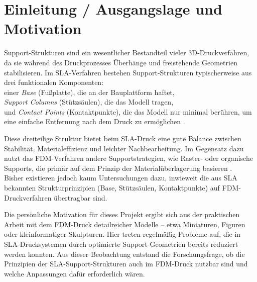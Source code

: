 \chapter{Einleitung / Ausgangslage und Motivation}
\label{cha:Einleitung / Ausgangslage und Motivation}

Support-Strukturen sind ein wesentlicher Bestandteil vieler 3D-Druckverfahren, da sie während des Druckprozesses Überhänge und freistehende Geometrien stabilisieren.  
Im SLA-Verfahren bestehen Support-Strukturen typischerweise aus drei funktionalen Komponenten:\\
einer \textit{Base} (Fußplatte), die an der Bauplattform haftet,\\
\textit{Support Columns} (Stützsäulen), die das Modell tragen,\\
und \textit{Contact Points} (Kontaktpunkte), die das Modell nur minimal berühren, um eine einfache Entfernung nach dem Druck zu ermöglichen \cite{FormlabsSupports}.  

Diese dreiteilige Struktur bietet beim SLA-Druck eine gute Balance zwischen Stabilität, Materialeffizienz und leichter Nachbearbeitung.  
Im Gegensatz dazu nutzt das FDM-Verfahren andere Supportstrategien, wie Raster- oder organische Supports, die primär auf dem Prinzip der Materialüberlagerung basieren \cite{JiangSupportReview, Kristiawan2021}.\\
Bisher existieren jedoch kaum Untersuchungen dazu, inwieweit die aus SLA bekannten Strukturprinzipien (Base, Stützsäulen, Kontaktpunkte) auf FDM-Druckverfahren übertragbar sind.  

Die persönliche Motivation für dieses Projekt ergibt sich aus der praktischen Arbeit mit dem FDM-Druck detailreicher Modelle – etwa Miniaturen, Figuren oder kleinformatiger Skulpturen.  
Hier treten regelmäßig Probleme auf, die in SLA-Drucksystemen durch optimierte Support-Geometrien bereits reduziert werden konnten.  
Aus dieser Beobachtung entstand die Forschungsfrage, ob die Prinzipien der SLA-Support-Strukturen auch im FDM-Druck nutzbar sind und welche Anpassungen dafür erforderlich wären.  
